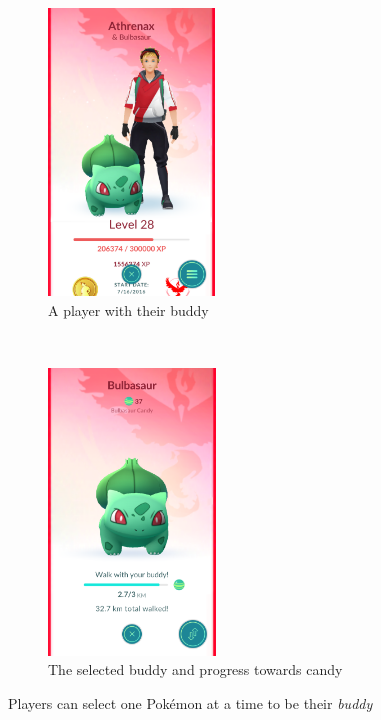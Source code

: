 \begin{figure}[h]
	\centering
	\begin{subfigure}[t]{0.45\textwidth}
		\centering
		\includegraphics[height=3in]{Figures/pogo-player-with-buddy}
		\caption{A player with their buddy}
	\end{subfigure}
	~
	\begin{subfigure}[t]{0.45\textwidth}
		\centering
		\includegraphics[height=3in]{Figures/pogo-buddy}
		\caption{The selected buddy and progress towards candy}
	\end{subfigure}
	\caption{Players can select one Pokémon at a time to be their \emph{buddy}}
\end{figure}

